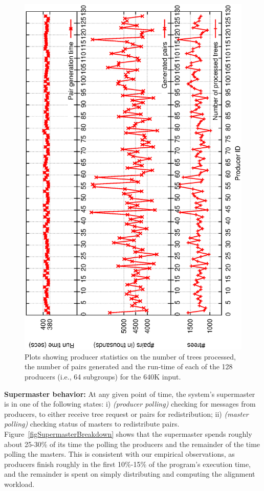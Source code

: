 \documentclass[10pt,journal,letterpaper,compsoc]{IEEEtran}
\begin{document}
\begin{figure}[h]
\centerline{
            \includegraphics[angle=-90, scale=0.33]{producer.eps}
}
\caption{
Plots showing producer statistics on the number of trees processed, the number of pairs generated and the run-time of each of the 128 producers (i.e., 64 subgroups) for the 640K input.
}
\label{figProducer}
\end{figure}

{\bf Supermaster behavior:} At any given point of time, the system's supermaster is in one of the following states: i) \emph{(producer polling)} checking for messages from producers, to either receive tree request or pairs for redistribution; ii) \emph{(master polling)} checking status of masters to redistribute pairs.  Figure~\ref{figSupermasterBreakdown} shows that the supermaster spends roughly about 25-30\% of its time the polling the producers and the remainder of the time polling the masters. This is consistent with our empirical observations, as producers finish roughly in the first 10\%-15\% of the program's execution time, and the remainder is spent on simply distributing and computing the alignment workload. 
\end{document}
